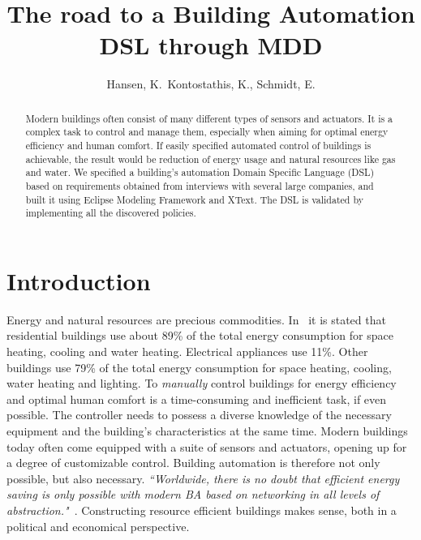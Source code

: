 \documentclass{llncs}
\begin{document}
\pagestyle{headings}
\title{The road to a Building Automation DSL through MDD}
\author{Hansen, K.\, Kontostathis, K., Schmidt, E.}
\maketitle

\vspace{-0.3cm}

\begin{abstract}
Modern buildings often consist of many different types of sensors and actuators. It is a complex task to control and manage them, especially when aiming for optimal energy efficiency and human comfort. If easily specified automated control of buildings is achievable, the result would be reduction of energy usage and natural resources like gas and water. We specified a building's automation Domain Specific Language (DSL) based on requirements obtained from interviews with several large companies, and built it using Eclipse Modeling Framework and XText. The DSL is validated by implementing all the discovered policies.
\end{abstract}

\vspace{-0.5cm}

\section{Introduction}
Energy and natural resources are precious commodities. In~\cite{janssen2004towards} it is stated that residential buildings use about 89\% of the total energy consumption for space heating, cooling and water heating. Electrical appliances use 11\%. Other buildings use 79\% of the total energy consumption for space heating, cooling, water heating and lighting. To \textit{manually} control buildings for energy efficiency and optimal human comfort is a time-consuming and inefficient task, if even possible. The controller needs to possess a diverse knowledge of the necessary equipment and the building's characteristics at the same time. Modern buildings today often come equipped with a suite of sensors and actuators, opening up for a degree of customizable control. Building automation is therefore not only possible, but also necessary. \textit{``Worldwide, there is no doubt that efficient energy saving is only possible with modern BA based on networking in all levels of abstraction."}~\cite{dietrich2010communication}. Constructing resource efficient buildings makes sense, both in a political and economical perspective. 
\end{document}
